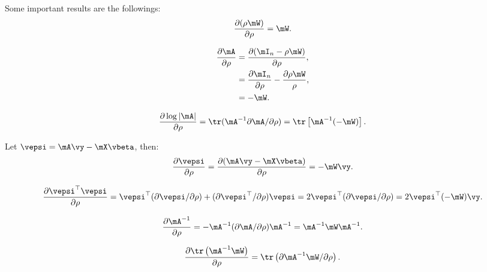 \documentclass[english,12pt]{book}\usepackage[]{graphicx}\usepackage[]{xcolor}
\begin{document}
\begin{definition}\label{definition:matrix_cal_sar}
Some important results  are the followings:
\begin{equation}\label{eq:mc_1}
\frac{\partial (\rho \mW)}{\partial \rho} = \mW.
\end{equation}

\begin{equation}\label{eq:mc_2}
  \begin{aligned}
\frac{\partial \mA}{\partial \rho} & = \frac{\partial (\mI_n - \rho\mW)}{\partial \rho}, \\
                                   & = \frac{\partial \mI_n}{\partial \rho} - \frac{\partial \rho\mW}{\rho}, \\
                                   & = -\mW.
 \end{aligned}
\end{equation}

\begin{equation}\label{eq:mc_3}
\frac{\partial \log \left|\mA\right|}{\partial \rho}  = \tr(\mA^{-1}\partial \mA / \partial \rho) = \tr\left[\mA^{-1}(-\mW)\right].
\end{equation}

Let $\vepsi = \mA\vy - \mX\vbeta$, then:
\begin{equation}\label{eq:mc_4}
  \frac{\partial \vepsi}{\partial \rho} =  \frac{\partial (\mA\vy - \mX\vbeta)}{\partial \rho} = -\mW\vy. 
\end{equation}

\begin{equation}\label{eq:mc_5}
  \frac{\partial \vepsi^\top \vepsi}{\partial \rho} = \vepsi^\top (\partial \vepsi / \partial \rho) + (\partial \vepsi ^\top / \partial \rho)\vepsi = 2\vepsi^\top (\partial \vepsi / \partial \rho) = 2\vepsi^\top(-\mW)\vy.
\end{equation}

\begin{equation}\label{eq:mc_6}
  \frac{\partial \mA^{-1}}{\partial \rho} = -\mA^{-1}(\partial \mA / \partial \rho)\mA^{-1} = \mA^{-1} \mW \mA^{-1}.
\end{equation}

\begin{equation}\label{eq:mc_7}
  \frac{\partial \tr\left(\mA^{-1} \mW\right)}{\partial \rho} = \tr\left(\partial \mA^{-1}\mW / \partial \rho\right). 
\end{equation}
\end{definition}
\end{document}
